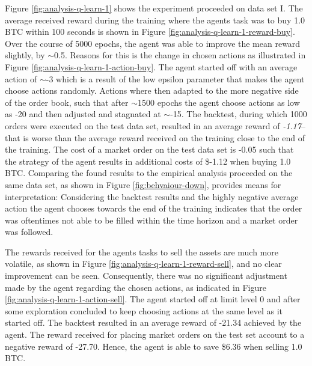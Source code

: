 Figure \ref{fig:analysis-q-learn-1} shows the experiment proceeded on data set I.
The average received reward during the training where the agents task was to buy 1.0 BTC within 100 seconds is shown in Figure \ref{fig:analysis-q-learn-1-reward-buy}.
Over the course of 5000 epochs, the agent was able to improve the mean reward slightly, by $\sim$0.5.
Reasons for this is the change in chosen actions as illustrated in Figure \ref{fig:analysis-q-learn-1-action-buy}.
The agent started off with an average action of $\sim$-3 which is a result of the low epsilon parameter that makes the agent choose actions randomly.
Actions where then adapted to the more negative side of the order book, such that after $\sim$1500 epochs the agent choose actions as low as -20 and then adjusted and stagnated at $\sim$-15.
The backtest, during which 1000 orders were executed on the test data set, resulted in an average reward of \textit{-1.17}--that is worse than the average reward received on the training close to the end of the training.
The cost of a market order on the test data set is -0.05 such that the strategy of the agent results in additional costs of \$-1.12 when buying 1.0 BTC.
Comparing the found results to the empirical analysis proceeded on the same data set, as shown in Figure \ref{fig:behvaiour-down}, provides means for interpretation:
Considering the backtest results and the highly negative average action the agent chooses towards the end of the training indicates that the order was oftentimes not able to be filled within the time horizon and a market order was followed.

The rewards received for the agents tasks to sell the assets are much more volatile, as shown in Figure \ref{fig:analysis-q-learn-1-reward-sell}, and no clear improvement can be seen.
Consequently, there was no significant adjustment made by the agent regarding the chosen actions, as indicated in Figure \ref{fig:analysis-q-learn-1-action-sell}.
The agent started off at limit level 0 and after some exploration concluded to keep choosing actions at the same level as it started off.
The backtest resulted in an average reward of -21.34 achieved by the agent.
The reward received for placing market orders on the test set account to a negative reward of -27.70.
Hence, the agent is able to save \$6.36 when selling 1.0 BTC.

